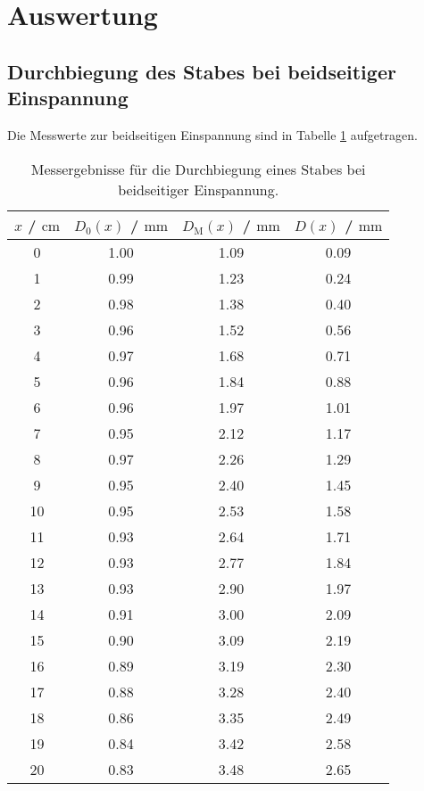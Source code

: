 \section{Auswertung}
\label{sec:Auswertung}

\FloatBarrier
\subsection{Durchbiegung des Stabes bei beidseitiger Einspannung}

Die Messwerte zur beidseitigen Einspannung sind in Tabelle \ref{tab:beidi} aufgetragen.

\begin{table}
	\centering
	\caption{Messergebnisse für die Durchbiegung eines Stabes bei beidseitiger Einspannung.}
	\label{tab:beidi}
	\begin{tabular}{cccc}
		\toprule
		$x$ / $\si{\centi\meter}$ & $D_0(x)$ / $\si{\milli\meter}$ & $D_{\mathrm{M}}(x)$ / $\si{\milli\meter}$ & $D(x)$ / $\si{\milli\meter}$ \\
		\midrule
		0 & 1.00 & 1.09 & 0.09 \\
		1 & 0.99 & 1.23 & 0.24 \\
		2 & 0.98 & 1.38 & 0.40 \\
		3 & 0.96 & 1.52 & 0.56 \\
		4 & 0.97 & 1.68 & 0.71 \\
		5 & 0.96 & 1.84 & 0.88 \\
		6 & 0.96 & 1.97 & 1.01 \\
		7 & 0.95 & 2.12 & 1.17 \\
		8 & 0.97 & 2.26 & 1.29 \\
		9 & 0.95 & 2.40 & 1.45 \\
		10 & 0.95 & 2.53 & 1.58 \\
		11 & 0.93 & 2.64 & 1.71 \\
		12 & 0.93 & 2.77 & 1.84 \\
		13 & 0.93 & 2.90 & 1.97 \\
		14 & 0.91 & 3.00 & 2.09 \\
		15 & 0.90 & 3.09 & 2.19 \\
		16 & 0.89 & 3.19 & 2.30 \\
		17 & 0.88 & 3.28 & 2.40 \\
		18 & 0.86 & 3.35 & 2.49 \\
		19 & 0.84 & 3.42 & 2.58 \\
		20 & 0.83 & 3.48 & 2.65 \\

\end{tabular}
\end{table}
